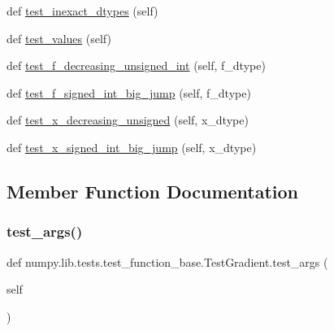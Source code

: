\begin{DoxyCompactItemize}
def \hyperlink{classnumpy_1_1lib_1_1tests_1_1test__function__base_1_1TestGradient_a3c1c9772d7f908906f5bdc524be6001d}{test\+\_\+inexact\+\_\+dtypes} (self)
\item 
def \hyperlink{classnumpy_1_1lib_1_1tests_1_1test__function__base_1_1TestGradient_aac0c83cca330ada977d42b1e27b180dd}{test\+\_\+values} (self)
\item 
def \hyperlink{classnumpy_1_1lib_1_1tests_1_1test__function__base_1_1TestGradient_a6d050b119cadd56d2c8bd408a29012b3}{test\+\_\+f\+\_\+decreasing\+\_\+unsigned\+\_\+int} (self, f\+\_\+dtype)
\item 
def \hyperlink{classnumpy_1_1lib_1_1tests_1_1test__function__base_1_1TestGradient_a96df6accc3deb0a5774cd1d1385e8f5b}{test\+\_\+f\+\_\+signed\+\_\+int\+\_\+big\+\_\+jump} (self, f\+\_\+dtype)
\item 
def \hyperlink{classnumpy_1_1lib_1_1tests_1_1test__function__base_1_1TestGradient_a20e9960d2caa7fb184606f296769dbc8}{test\+\_\+x\+\_\+decreasing\+\_\+unsigned} (self, x\+\_\+dtype)
\item 
def \hyperlink{classnumpy_1_1lib_1_1tests_1_1test__function__base_1_1TestGradient_a97fca83dd838f159d01e630e0b0ae392}{test\+\_\+x\+\_\+signed\+\_\+int\+\_\+big\+\_\+jump} (self, x\+\_\+dtype)
\end{DoxyCompactItemize}


\subsection{Member Function Documentation}
\mbox{\label{classnumpy_1_1lib_1_1tests_1_1test__function__base_1_1TestGradient_a01d968d0e2012fc80b9e50ced7d3370c}} 
\subsubsection{\texorpdfstring{test\+\_\+args()}{test\_args()}}
{\footnotesize\ttfamily def numpy.\+lib.\+tests.\+test\+\_\+function\+\_\+base.\+Test\+Gradient.\+test\+\_\+args (\begin{DoxyParamCaption}\item[{}]{self }\end{DoxyParamCaption})}

